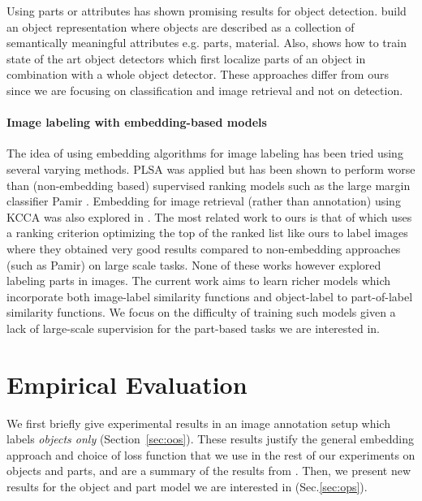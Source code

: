 Using parts or attributes has shown promising results for object detection.
\cite{core} build an object representation where objects are described as a
collection of semantically meaningful attributes e.g. parts, material.  Also, \cite{fel2009}
shows how to train state of the art object detectors which first localize
parts of an object in combination with a whole object detector.
These approaches differ from ours since we are focusing
on classification and image retrieval and not on detection.



\paragraph{Image labeling with embedding-based models}

The idea of using embedding algorithms for image labeling has been tried
using several varying methods.
PLSA \cite{monay2004plsa} was applied but has been shown to perform
worse than (non-embedding based) supervised ranking models such as the large margin classifier
 {\sc Pamir} \cite{grangier:2008:tpami}. Embedding for image retrieval (rather than annotation)
using KCCA was also explored in \cite{zhou2007semi}.
The most related work to ours is that of \cite{wsabie} which uses a ranking criterion
optimizing the top of the ranked list like ours to label images where they obtained very good
results compared to non-embedding approaches (such as {\sc Pamir}) on large scale tasks.
None of these works however explored labeling parts in images.
The current work aims to learn richer models which incorporate both
 image-label similarity functions and object-label to part-of-label similarity functions.
We focus on the difficulty of training such models 
given a lack of large-scale supervision for the part-based tasks we are interested in.


\section{Empirical Evaluation}\label{sec:exp}


We first briefly give experimental results in an image annotation setup which
labels {\em objects only} (Section~\ref{sec:oos}).  These results justify the
general embedding approach and choice of loss function that we use in the rest
of our experiments on objects and parts, and are a summary of the results from
\cite{image-wsabie}.  Then, we present new results for the object and part
model we are interested in (Sec.\ref{sec:ops}).

